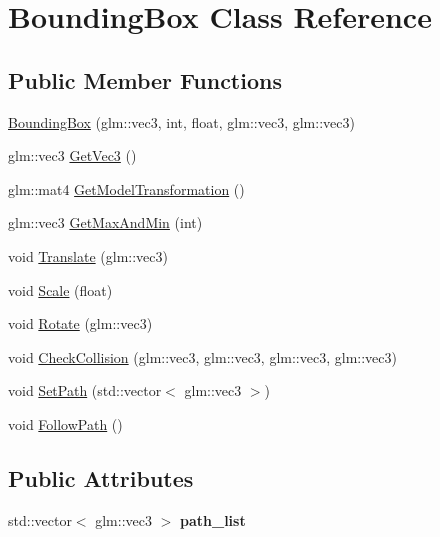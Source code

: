 \hypertarget{classBoundingBox}{}\section{Bounding\+Box Class Reference}
\label{classBoundingBox}
\subsection*{Public Member Functions}
\begin{DoxyCompactItemize}
\item 
\hyperlink{classBoundingBox_a85b1b2999c0810fbfcffe0f82f5ef581}{Bounding\+Box} (glm\+::vec3, int, float, glm\+::vec3, glm\+::vec3)
\item 
glm\+::vec3 \hyperlink{classBoundingBox_ae030e99b894d0326307268ec80a046a9}{Get\+Vec3} ()
\item 
glm\+::mat4 \hyperlink{classBoundingBox_ac8214cfca4958127d0bacd263c6008d4}{Get\+Model\+Transformation} ()
\item 
glm\+::vec3 \hyperlink{classBoundingBox_a968169f93442add1db9b5b4ca9e7d358}{Get\+Max\+And\+Min} (int)
\item 
void \hyperlink{classBoundingBox_afb77ba3c0b8ad8862e92f18adba8258e}{Translate} (glm\+::vec3)
\item 
void \hyperlink{classBoundingBox_a47aa793b888dc49037021c707b83d3fb}{Scale} (float)
\item 
void \hyperlink{classBoundingBox_ad94b5e157e468a21ce7a7ade20a74c09}{Rotate} (glm\+::vec3)
\item 
void \hyperlink{classBoundingBox_aed8d9c54c463e21f4bcdd8340e141cfb}{Check\+Collision} (glm\+::vec3, glm\+::vec3, glm\+::vec3, glm\+::vec3)
\item 
void \hyperlink{classBoundingBox_a91f44328bdf42b85a02538e93f50081c}{Set\+Path} (std\+::vector$<$ glm\+::vec3 $>$)
\item 
void \hyperlink{classBoundingBox_a4bda88b17a66734dea30916f048679c6}{Follow\+Path} ()
\end{DoxyCompactItemize}
\subsection*{Public Attributes}
\begin{DoxyCompactItemize}
\item 
\hypertarget{classBoundingBox_a06fd05f65178892ca298446e7c111f3c}{}std\+::vector$<$ glm\+::vec3 $>$ {\bfseries path\+\_\+list}\label{classBoundingBox_a06fd05f65178892ca298446e7c111f3c}

\end{DoxyCompactItemize}


